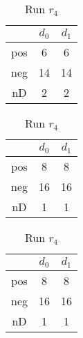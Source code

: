\begin{table}[h]
$\qquad \qquad$ %
\begin{tabular}{| c | c c |}
 \hline
  & $d_0$ & $d_1$ \\
 \hline
 pos & 6  & 6 \\
 neg & 14  & 14 \\
 nD & 2  & 2 \\\hline 
\end{tabular}
\hspace{17pt}
\begin{tabular}{| c | c c |}
 \hline
  & $d_0$ & $d_1$ \\
 \hline
 pos & 8  & 8 \\
 neg & 16  & 16 \\
 nD & 1  & 1 \\\hline 
\end{tabular}
\hspace{17pt}
\begin{tabular}{| c | c c |}
 \hline
  & $d_0$ & $d_1$ \\
 \hline
 pos & 8  & 8 \\
 neg & 16  & 16 \\
 nD & 1  & 1 \\\hline 
\end{tabular}
\caption{Run $r_4$}
\end{table}
